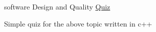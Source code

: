 software Design and Quality \hyperlink{class_quiz}{Quiz}

Simple quiz for the above topic written in c++ 